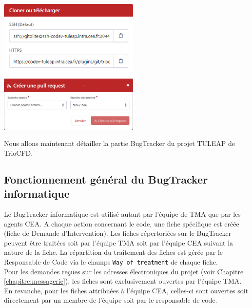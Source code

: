 \begin{itemize}[label=$\Rightarrow$, font=\LARGE]
   \begin{multicols}{2}
   \includegraphics[width=7cm]{pictures/Tuleap_clone.png}
   \columnbreak
   \includegraphics[width=7cm]{pictures/PR.png}\vspace*{1.1cm}
   \end{multicols}
\end{itemize}

Nous allons maintenant d\'etailler la partie BugTracker du projet TULEAP de TrioCFD.
\subsection{Fonctionnement g\'en\'eral du BugTracker informatique}
Le BugTracker informatique est utilisé autant par l'\'equipe de TMA que par les agents CEA. A chaque action concernant le code, une fiche spécifique est créée (fiche de Demande d'Intervention). Les fiches répertoriées sur le BugTracker peuvent \^etre trait\'ees soit par l'équipe TMA soit par l'équipe CEA suivant la nature de la fiche. La répartition du traitement des fiches est gérée par le Responsable de Code via le champs \texttt{Way of treatment} de chaque fiche.\\

Pour les demandes re\c cues sur les adresses \'electroniques du projet (voir Chapitre \ref{chapitre:messagerie}), les fiches sont exclusivement ouvertes par l'\'equipe TMA. En revanche, pour les fiches attribu\'ees \`a l'\'equipe CEA, celles-ci sont ouvertes soit directement par un membre de l'\'equipe soit par le responsable de code.\\

